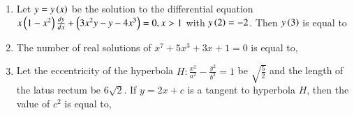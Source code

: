 \documentclass[journal]{IEEEtran}
\begin{document}
\begin{enumerate}
\begin{enumerate}
			\end{enumerate}
		\item Let  $y=y\left(x\right)$ be the solution to the differential equation $x\left(1-x^2\right)\frac{dy}{dx}+\left(3x^2y-y-4x^3\right)=0,x>1$ with $y\left(2\right)=-2$. Then $y\left(3\right)$ is equal to
		\begin{enumerate}
		\end{enumerate}
	\item The number of real solutions of $x^7+5x^3+3x+1=0$ is equal to,
			\begin{enumerate}
				\begin{multicols}{2}
					\item $0$
				\columnbreak
					\item $1$
				\end{multicols}
				\begin{multicols}{2}
					\item $3$
				\columnbreak
					\item $5$
				\end{multicols}
		\end{enumerate}
	\item Let the eccentricity of the hyperbola $H: \frac{x^2}{a^2}-\frac{y^2}{b^2}=1$ be $\sqrt{\frac{5}{2}}$ and the length of the latus rectum be $6\sqrt{2}$. If $y=2x+c$ is a tangent to hyperbola $H$, then the value of $c^2$ is equal to,
		\begin{enumerate}
				\begin{multicols}{2}
				\item $18$
				\columnbreak

\end{multicols}
\end{enumerate}
\end{enumerate}
\end{document}
